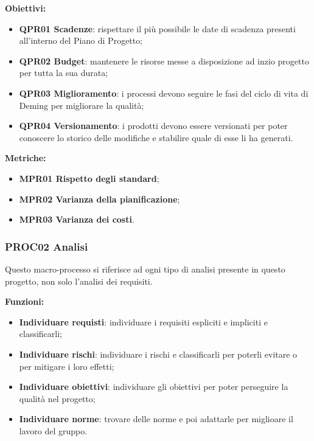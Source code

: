 \documentclass[../piano_di_qualifica.tex]{subfiles}
\begin{document}
\textbf{Obiettivi:}
\smallbreak
\begin{itemize}
	\item \textbf{QPR01 Scadenze}: rispettare il più possibile le date di scadenza presenti all'interno del Piano di Progetto;
	\item \textbf{QPR02 Budget}: mantenere le risorse messe a disposizione ad inzio progetto per tutta la sua durata;
	\item \textbf{QPR03 Miglioramento}: i processi devono seguire le fasi del ciclo di vita di Deming per migliorare la qualità;
	\item \textbf{QPR04 Versionamento}: i prodotti devono essere versionati per poter conoscere lo storico delle modifiche e stabilire quale di esse li ha generati.
\end{itemize}

\textbf{Metriche:}
\smallbreak
\begin{itemize}
	\item \textbf{MPR01 Rispetto degli standard};
	\item \textbf{MPR02 Varianza della pianificazione};
	\item \textbf{MPR03 Varianza dei costi}.
\end{itemize}

\subsubsection{PROC02 Analisi}
Questo macro-processo si riferisce ad ogni tipo di analisi presente in questo progetto, non solo l'analisi dei requisiti.

\textbf{Funzioni:}
\smallbreak
\begin{itemize}
	\item \textbf{Individuare requisti}: individuare i requisiti espliciti e impliciti e classificarli;
	\item \textbf{Individuare rischi}: individuare i rischi e classificarli per poterli evitare o per mitigare i loro effetti;
	\item \textbf{Individuare obiettivi}: individuare gli obiettivi per poter perseguire la qualità nel progetto;
	\item \textbf{Individuare norme}: trovare delle norme e poi adattarle per miglioare il lavoro del gruppo.
\end{itemize}
\end{document}

